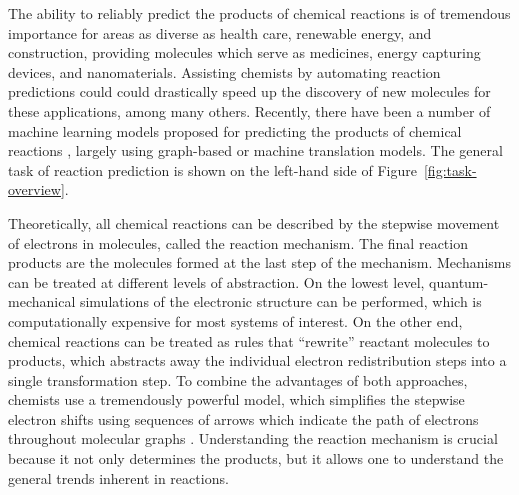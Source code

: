 
The ability to reliably predict the products of chemical reactions is of tremendous importance for areas as diverse as health care, renewable energy, and construction, providing molecules which serve as medicines, energy capturing devices, and nanomaterials. 
Assisting chemists by automating reaction predictions could could drastically speed up the discovery of new molecules for these applications, among many others. Recently, there have been a number of machine learning models proposed for predicting the products of chemical reactions \cite{coley2017prediction,jin2017predicting,schwaller2017found,neural-symbolic,segler2018planning,wei2016neural}, largely using graph-based or machine translation models. The general task of reaction prediction is shown on the left-hand side of Figure~\ref{fig:task-overview}.

Theoretically, all chemical reactions can be described by the stepwise movement of electrons in molecules, called the reaction mechanism. The final reaction products are the molecules formed at the last step of the mechanism. 
Mechanisms can be treated at different levels of abstraction. On the lowest level, quantum-mechanical simulations of the electronic structure can be performed, which is computationally expensive for most systems of interest. 
On the other end, chemical reactions can be treated as rules that ``rewrite'' reactant molecules to products, which abstracts away the individual electron redistribution steps into a single transformation step. 
To combine the advantages of both approaches, chemists use a tremendously powerful model, which simplifies the stepwise electron shifts using sequences of arrows which indicate the path of electrons throughout molecular graphs \cite{herges1994organizing}. 
Understanding the reaction mechanism is crucial because it not only determines the products, but it allows one to understand the general trends inherent in reactions. %


